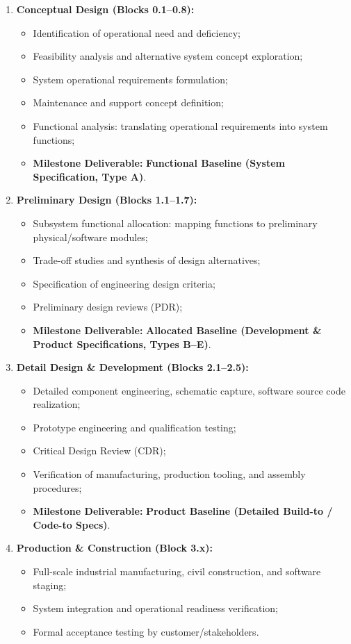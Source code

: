 \begin{enumerate}[leftmargin=2em]
    \item \textbf{Conceptual Design (Blocks 0.1--0.8):}
    \begin{itemize}
        \item Identification of operational need and deficiency;
        \item Feasibility analysis and alternative system concept exploration;
        \item System operational requirements formulation;
        \item Maintenance and support concept definition;
        \item Functional analysis: translating operational requirements into system functions;
        \item \textbf{Milestone Deliverable:} \textbf{Functional Baseline (System Specification, Type A)}.
    \end{itemize}
    \item \textbf{Preliminary Design (Blocks 1.1--1.7):}
    \begin{itemize}
        \item Subsystem functional allocation: mapping functions to preliminary physical/software modules;
        \item Trade-off studies and synthesis of design alternatives;
        \item Specification of engineering design criteria;
        \item Preliminary design reviews (PDR);
        \item \textbf{Milestone Deliverable:} \textbf{Allocated Baseline (Development \& Product Specifications, Types B--E)}.
    \end{itemize}
    \item \textbf{Detail Design \& Development (Blocks 2.1--2.5):}
    \begin{itemize}
        \item Detailed component engineering, schematic capture, software source code realization;
        \item Prototype engineering and qualification testing;
        \item Critical Design Review (CDR);
        \item Verification of manufacturing, production tooling, and assembly procedures;
        \item \textbf{Milestone Deliverable:} \textbf{Product Baseline (Detailed Build-to / Code-to Specs)}.
    \end{itemize}
    \item \textbf{Production \& Construction (Block 3.x):}
    \begin{itemize}
        \item Full-scale industrial manufacturing, civil construction, and software staging;
        \item System integration and operational readiness verification;
        \item Formal acceptance testing by customer/stakeholders.
    \end{itemize}
\end{enumerate}

